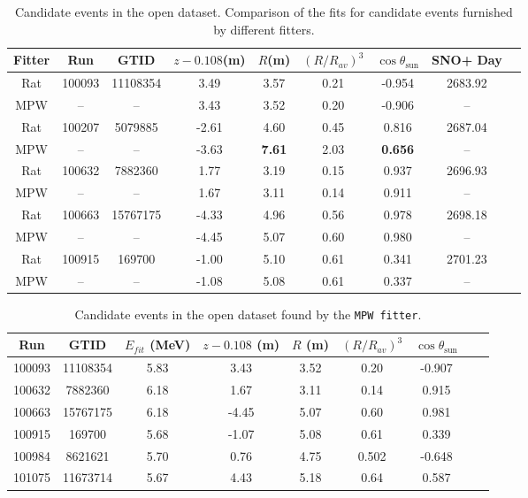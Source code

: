 \begin{table}[ht]
	\centering
	\caption[Candidate events in the open dataset.]{Candidate events in the open dataset. Comparison of the fits for candidate events furnished by different fitters.}
	\label{tab:opendataCompare}
	\begin{tabular*}{150mm}{c@{\extracolsep{\fill}}cccccccc}
		\toprule
		Fitter &	Run &  GTID &  $z-0.108$(m) & $R$(m)& $(R/R_{av})^3$ & $\cos\theta_\mathrm{sun}$ & SNO+ Day\\
		\hline 
		Rat & 100093 &11108354 &3.49 &3.57 &0.21 &-0.954 &2683.92 \\	
		MPW &  --& --& 3.43 &	3.52 &	0.20	& -0.906 & --\\
		Rat &	100207 &5079885 &-2.61 &4.60 &0.45 &0.816 &2687.04\\
		MPW &	 --& --& -3.63 & \textbf{7.61} &	2.03 & \textbf{0.656} & -- \\
		Rat &100632 &7882360 &1.77 &3.19 &0.15 &0.937 &2696.93\\
		MPW &    --& --&  1.67 & 3.11 &	0.14 & 0.911 & -- \\
		Rat &100663 &15767175 &-4.33& 4.96 &0.56 &0.978 &2698.18\\
		MPW & --& -- &-4.45 &	5.07 &	0.60 &	0.980 & -- \\
		Rat &100915 &169700 &-1.00 &5.10 &0.61 &0.341 &2701.23\\
		MPW &	--& --& -1.08 &	5.08 &	0.61 &	0.337 & -- \\	
		\bottomrule
	\end{tabular*}
\end{table}

\begin{table}[ht]
	\centering
	\caption{Candidate events in the open dataset found by the \texttt{MPW fitter}.}
	\label{tab:opendataMPW}
	\begin{tabular*}{145mm}{c@{\extracolsep{\fill}}cccccccc}
		\toprule
		Run & GTID & $E_{fit}$ (MeV) & $z-0.108$ (m) & $R$ (m)& $(R/R_{av})^3$ & $\cos\theta_\mathrm{sun}$\\
		\hline 
		100093 &	11108354	&5.83 & 3.43 & 3.52 & 0.20 & -0.907\\
		100632&	7882360    &6.18& 1.67 &3.11 &0.14 &0.915\\
		100663&	15767175   &	6.18 & -4.45 &5.07 &0.60&	0.981\\
		100915&	169700   &	5.68 &	-1.07 &5.08 &0.61&0.339\\
		100984&	8621621&	5.70 & 0.76 &4.75 &0.502&-0.648\\
		101075&	11673714&	5.67 &4.43 &5.18 &0.64& 0.587\\
		\bottomrule
	\end{tabular*}
\end{table}

